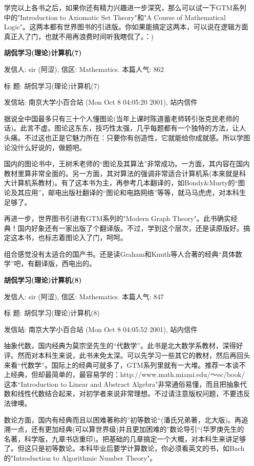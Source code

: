 学完以上各书之后，如果你还有精力兴趣进一步深究，那么可以试一下GTM系列中的"Introduction to Axiomatic Set Theory"和"A Course of Mathematical Logic"。这两本都有世界图书的引进版。你如果能搞定这两本，可以说在逻辑方面真正入了门，也就不用再浪费时间听我瞎侃了。：)

\textbf{胡侃学习(理论)计算机(7)}

发信人: sir (阿涩), 信区: Mathematics. 本篇人气: 862

标  题: 胡侃学习(理论)计算机(7)

发信站: 南京大学小百合站 (Mon Oct  8 04:05:20 2001), 站内信件

据说全中国最多只有三十个人懂图论(当年上课时陈道蓄老师转引张克民老师的话)。此言不虚。图论这东东，技巧性太强，几乎每题都有一个独特的方法，让人头痛。不过这也正是它魅力所在：只要你有创造性，它就能给你成就感。所以学图论没什么好说的，做题吧。

国内的图论书中，王树禾老师的“图论及其算法”非常成功。一方面，其内容在国内教材里算非常全面的。另一方面，其对算法的强调非常适合计算机系(本来就是科大计算机系教材)。有了这本书为主，再参考几本翻译的，如Bondy\&Murty的“图论及其应用”，邮电出版社翻译的“图论和电路网络”等等，就马马虎虎，对本科生足够了。

再进一步，世界图书引进有GTM系列的"Modern Graph Theory"。此书确实经典！国内好象还有一家出版了个翻译版。不过，学到这个层次，还是读原版好。搞定这本书，也标志着图论入了门，呵呵。

组合感觉没有太适合的国产书。还是读Graham和Knuth等人合著的经典“具体数学”吧，有翻译版，西电出的。


\textbf{胡侃学习(理论)计算机(8)}

发信人: sir (阿涩), 信区: Mathematics. 本篇人气: 847

标  题: 胡侃学习(理论)计算机(8)

发信站: 南京大学小百合站 (Mon Oct  8 04:05:52 2001), 站内信件

抽象代数，国内经典为莫宗坚先生的“代数学”。此书是北大数学系教材，深得好评。然而对本科生来说，此书未免太深。可以先学习一些其它的教材，然后再回头来看“代数学”。国际上的经典可就多了，GTM系列里就有一大堆。推荐一本谈不上经典，但却最简单的，最容易学的：http://www.math.miami.edu/～ec/book/ 这本“Introduction to Linear and Abstract Algebra"非常通俗易懂，而且把抽象代数和线性代数结合起来，对初学者来说非常理想。不过请注意版权问题，不要违反法律噢。

数论方面，国内有经典而且以困难著称的”初等数论“(潘氏兄弟著，北大版)。再追溯一点，还有更加经典(可以算世界级)并且更加困难的”数论导引“(华罗庚先生的名著，科学版，九章书店重印)。把基础的几章搞定一个大概，对本科生来讲足够了。但这只是初等数论。本科毕业后要学计算数论，你必须看英文的书，如Bach的"Introduction to Algorithmic Number Theory"。


